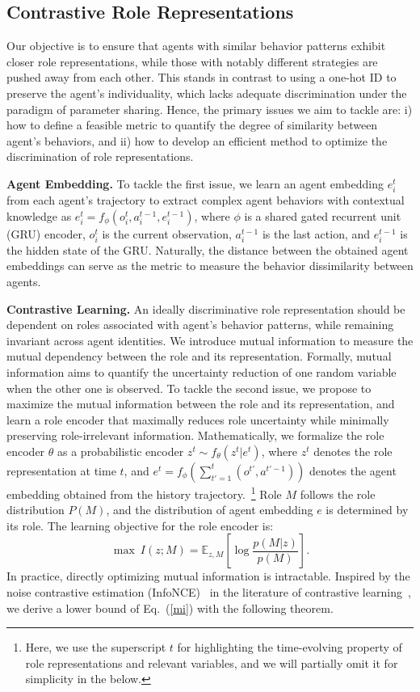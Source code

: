 \documentclass{article} %
\begin{document}
\subsection{Contrastive Role Representations}\label{sec:role}
Our objective is to ensure that agents with similar behavior patterns exhibit closer role representations, while those with notably different strategies are pushed away from each other.
This stands in contrast to using a one-hot ID to preserve the agent's individuality, which lacks adequate discrimination under the paradigm of parameter sharing.
Hence, the primary issues we aim to tackle are: i) how to define a feasible metric to quantify the degree of similarity between agent's behaviors, and ii) how to develop an efficient method to optimize the discrimination of role representations.


\textbf{Agent Embedding.} 
To tackle the first issue, we learn an agent embedding $e_i^t$ from each agent's trajectory to extract complex agent behaviors with contextual knowledge as $e_i^t=f_{\phi}(o_i^t, a^{t-1}_i, e^{t-1}_i)$, where $\phi$ is a shared gated recurrent unit (GRU) encoder, $o^t_i$ is the current observation, $a^{t-1}_i$ is the last action, and $e^{t-1}_i$ is the hidden state of the GRU.
Naturally, the distance between the obtained agent embeddings can serve as the metric to measure the behavior dissimilarity between agents.


\textbf{Contrastive Learning.} 
An ideally discriminative role representation should be dependent on roles associated with agent's behavior patterns, while remaining invariant across agent identities.
We introduce mutual information to measure the mutual dependency between the role and its representation.
Formally, mutual information aims to quantify the uncertainty reduction of one random variable when the other one is observed.
To tackle the second issue, we propose to maximize the mutual information between the role and its representation, and learn a role encoder that maximally reduces role uncertainty while minimally preserving role-irrelevant information.
Mathematically, we formalize the role encoder $\theta$ as a probabilistic encoder $z^t \!\sim\! f_{\theta}(z^t|e^t)$, where $z^t$ denotes the role representation at time $t$, and $e^t\!=\!f_{\phi}(\sum_{t'=1}^t(o^{t'},a^{t'-1}))$ denotes the agent embedding obtained from the history trajectory.~\footnote{Here, we use the superscript $t$ for highlighting the time-evolving property of role representations and relevant variables, and we will partially omit it for simplicity in the below.}
Role $M$ follows the role distribution $P(M)$, and the distribution of agent embedding $e$ is determined by its role.
The learning objective for the role encoder is:
\begin{equation}
    \max~I(z; M) = \mathbb{E}_{z,M}\left[\log \frac{p(M|z)}{p(M)}\right].
    \label{mi}
\end{equation}
In practice, directly optimizing mutual information is intractable.
Inspired by the noise contrastive estimation (InfoNCE)~\citep{oord2018representation} in the literature of contrastive learning~\citep{laskin2020curl,yuan2022robust}, we derive a lower bound of Eq.~(\ref{mi}) with the following theorem.
\end{document}
